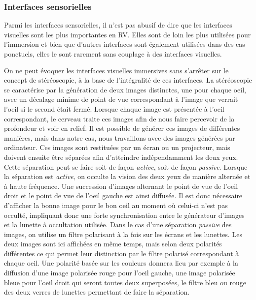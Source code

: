 \subsubsection{Interfaces sensorielles} \label{interface_sensor}

Parmi les interfaces sensorielles, il n'est pas abusif de dire que les interfaces visuelles sont les plus importantes en RV. Elles sont de loin les plus utilisées pour l'immersion et bien que d'autres interfaces sont également utilisées dans des cas ponctuels, elles le sont rarement sans couplage à des interfaces visuelles.


On ne peut évoquer les interfaces visuelles immersives sans s'arrêter sur le concept de stéréoscopie, à la base de l'intégralité de ces interfaces. La stéréoscopie se caractérise par la génération de deux images distinctes, une pour chaque oeil, avec un décalage minime de point de vue correspondant à l'image que verrait l'oeil si le second était fermé. Lorsque chaque image est présentée à l'oeil correspondant, le cerveau traite ces images afin de nous faire percevoir de la profondeur et voir en relief. Il est possible de générer ces images de différentes manières, mais dans notre cas, nous travaillons avec des images générées par ordinateur. Ces images sont restituées par un écran ou un projecteur, mais doivent ensuite être séparées afin d'atteindre indépendamment les deux yeux. Cette séparation peut se faire soit de façon \textit{active}, soit de façon \textit{passive}. Lorsque la séparation est \textit{active}, on occulte la vision des deux yeux de manière alternée et à haute fréquence. Une succession d'images alternant le point de vue de l'oeil droit et le point de vue de l'oeil gauche est ainsi diffusée. Il est donc nécessaire d'afficher la bonne image pour le bon oeil au moment où celui-ci n'est pas occulté, impliquant donc une forte synchronisation entre le générateur d'images et la lunette à occultation utilisée.
Dans le cas d'une séparation \textit{passive} des images, on utilise un filtre polarisant à la fois sur les écrans et les lunettes. Les deux images sont ici affichées en même temps, mais selon deux polarités différentes ce qui permet leur distinction par le filtre polarisé correspondant à chaque oeil. Une polarité basée sur les couleurs donnera lieu par exemple à la diffusion d'une image polarisée rouge pour l'oeil gauche, une image polarisée bleue pour l'oeil droit qui seront toutes deux superposées, le filtre bleu ou rouge des deux verres de lunettes permettant de faire la séparation.

